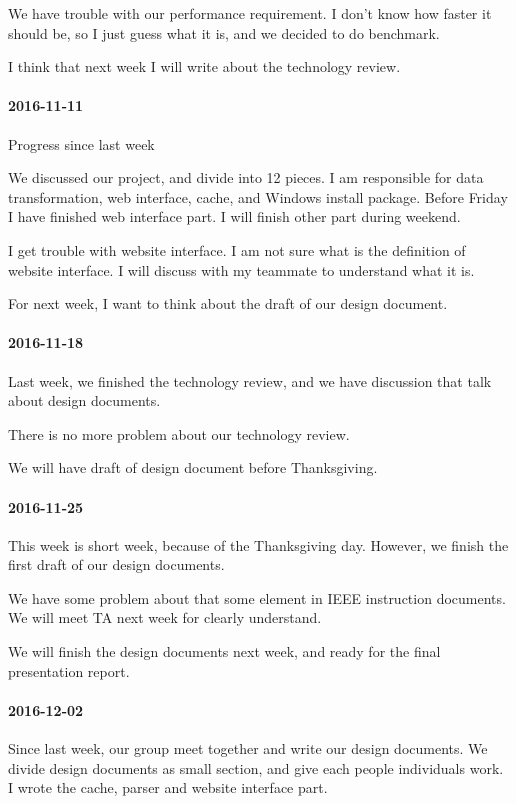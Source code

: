 We have trouble with our performance requirement. I don't know how faster it should be, so I just guess what it is, and we decided to do benchmark.


I think that next week I will write about the technology review.

\paragraph{2016-11-11}
Progress since last week

We discussed our project, and divide into 12 pieces. I am responsible for data transformation, web interface, cache, and Windows install package. Before Friday I have finished web interface part. I will finish other part during weekend.


I get trouble with website interface. I am not sure what is the definition of website interface. I will discuss with my teammate to understand what it is.


For next week, I want to think about the draft of our design document.

\paragraph{2016-11-18}
Last week, we finished the technology review, and we have discussion that talk about design documents.


There is no more problem about our technology review.


We will have draft of design document before Thanksgiving.

\paragraph{2016-11-25}
This week is short week, because of the Thanksgiving day. However, we finish the first draft of our design documents.


We have some problem about that some element in IEEE instruction documents. We will meet TA next week for clearly understand.


We will finish the design documents next week, and ready for the final presentation report.

\paragraph{2016-12-02}
Since last week, our group meet together and write our design documents. We divide design documents as small section, and give each people individuals work. I wrote the cache, parser and website interface part.


